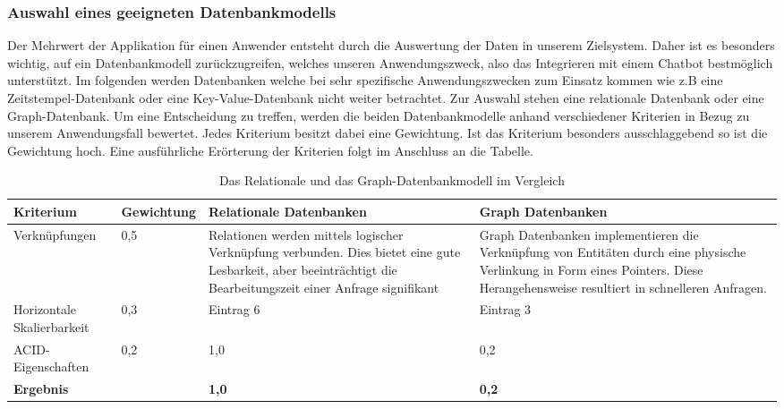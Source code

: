 \documentclass[10pt]{article}
\begin{document}
\subsubsection{Auswahl eines geeigneten Datenbankmodells}
Der Mehrwert der Applikation für einen Anwender entsteht durch die Auswertung der Daten in unserem Zielsystem. Daher ist es besonders wichtig, auf ein Datenbankmodell zurückzugreifen, welches unseren Anwendungszweck, also das Integrieren mit einem Chatbot bestmöglich unterstützt. Im folgenden werden Datenbanken welche bei sehr spezifische Anwendungszwecken zum Einsatz kommen wie z.B eine Zeitstempel-Datenbank oder eine Key-Value-Datenbank nicht weiter betrachtet. Zur Auswahl stehen eine relationale Datenbank oder eine Graph-Datenbank. Um eine Entscheidung zu treffen, werden die beiden Datenbankmodelle anhand verschiedener Kriterien in Bezug zu unserem Anwendungsfall bewertet. Jedes Kriterium besitzt dabei eine Gewichtung. Ist das Kriterium besonders ausschlaggebend so ist die Gewichtung hoch. Eine ausführliche Erörterung der Kriterien folgt im Anschluss an die Tabelle.

\begin{table}[h!]
\centering
\caption{Das Relationale und das Graph-Datenbankmodell im Vergleich}
\begin{tabularx}{\textwidth}{|p{}|p{}|p{}|p{}|}
\hline
\textbf{Kriterium} & \textbf{Gewichtung} & \textbf{Relationale \newline Datenbanken} & \textbf{Graph Datenbanken} \\ \hline
Verknüpfungen         & 0,5         & Relationen werden mittels logischer Verknüpfung verbunden. Dies bietet eine gute Lesbarkeit, aber beeinträchtigt die Bearbeitungszeit einer Anfrage signifikant & Graph Datenbanken implementieren die Verknüpfung von Entitäten durch eine physische Verlinkung in Form eines Pointers. Diese Herangehensweise resultiert in schnelleren Anfragen.  \\ \hline
Horizontale \newline Skalierbarkeit         & 0,3         & Eintrag 6   & Eintrag 3        \\ \hline
ACID-Eigenschaften         & 0,2         & 1,0    & 0,2      \\ \hline
\textbf{Ergebnis}         &         & \textbf{1,0}    & \textbf{0,2}      \\ \hline
\end{tabularx}
\end{table}
\end{document}
